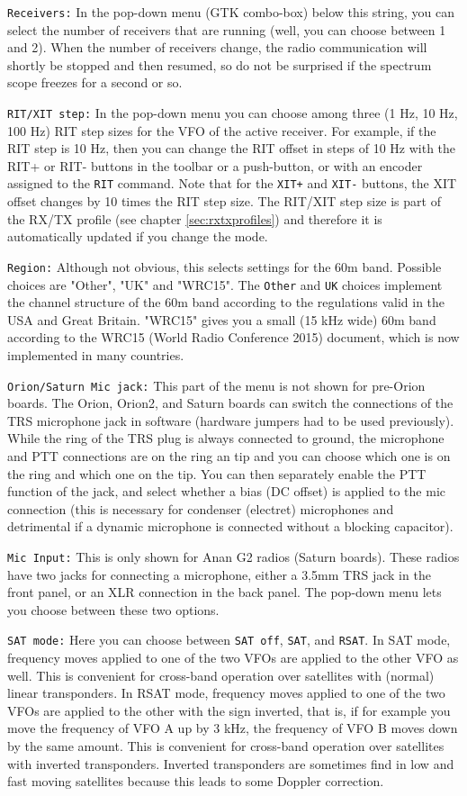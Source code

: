 \documentclass[12pt]{book}
\def\rett#1{\texttt{\color{red}#1}}
\def\bltt#1{\texttt{\color{blue}#1}}
\begin{document}
\rett{Receivers:} In the pop-down menu (GTK combo-box) below this string, you can select the number
of receivers that are running (well, you can choose between 1 and 2). When the number of receivers change,
the radio communication will shortly be stopped and then resumed, so do not be surprised if the spectrum
scope freezes for a second or so.

\rett{RIT/XIT step:} In the pop-down menu you can choose among three (1 Hz, 10 Hz, 100 Hz) RIT step sizes
for the VFO of the active receiver. For example, if the RIT step is 10 Hz, then you can change the RIT offset
in steps of 10 Hz with the RIT+ or RIT- buttons in the toolbar or a push-button, or with
an encoder assigned to the \bltt{RIT} command. Note that for the
\bltt{XIT+} and \bltt{XIT-} buttons, the XIT offset changes by 10 times the RIT step size. The RIT/XIT step
size is part of the RX/TX profile (see chapter \ref{sec:rxtxprofiles}) and therefore it is automatically updated
if you change the mode.

\rett{Region:} Although not obvious, this selects settings for the 60m band. Possible choices are "Other",
"UK" and "WRC15". The \texttt{Other} and \texttt{UK} choices implement the channel structure of the 60m
band according to the regulations valid in the USA and Great Britain. "WRC15" gives you a small (15 kHz
wide) 60m band according to the WRC15 (World Radio Conference 2015) document, which is now implemented in
many countries.

\rett{Orion/Saturn Mic jack:} This part of the menu is not shown for pre-Orion boards.
The Orion, Orion2, and Saturn boards can switch the connections
of the TRS microphone jack in software (hardware jumpers had to be used previously).
While the ring of the TRS plug is always connected to ground, the microphone and PTT connections are on the
ring an tip and you can choose which one is on the ring and which one on the tip. You can then separately
enable the PTT function of the jack, and select whether a bias (DC offset) is applied to the mic connection
(this is necessary for condenser (electret) microphones and detrimental if a dynamic microphone is connected without
a blocking capacitor).

\rett{Mic Input:} This is only shown for Anan G2 radios (Saturn boards).
These radios have two jacks for connecting a
microphone, either a 3.5mm TRS jack in the front panel, or an XLR connection in the back panel. The pop-down
menu lets you choose between these two options.

\rett{SAT mode:} Here you can choose between \texttt{SAT off}, \texttt{SAT}, and \texttt{RSAT}. In SAT mode,
frequency moves applied to one of the two VFOs are applied to the other VFO as well. This is convenient
for cross-band operation over satellites with (normal) linear transponders. In RSAT mode, frequency
moves applied to one of the two VFOs are applied to the other with the sign inverted, that is, if
for example you move the frequency of VFO A up by 3 kHz, the frequency of VFO B moves down by the same
amount. This is convenient for cross-band operation over satellites with inverted transponders. Inverted
transponders are sometimes find in low and fast moving satellites because this leads to some Doppler
correction.
\end{document}
